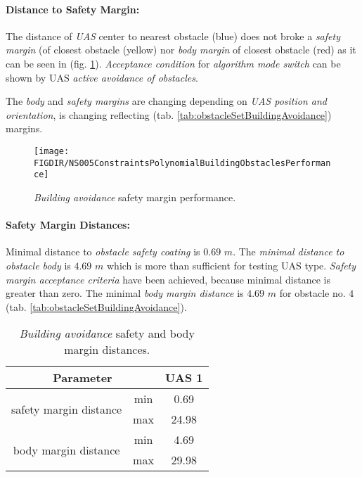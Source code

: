 \noindent\paragraph{Distance to Safety Margin:} The distance of \emph{UAS} center to nearest obstacle (blue) does not broke a \emph{safety margin} (of closest obstacle (yellow)  nor \emph{body margin} of closest obstacle (red) as it can be seen in (fig. \ref{fig:testCaseBuildingAvoidancePerformance}). \emph{Acceptance condition} for \emph{algorithm mode switch} can be shown by UAS \emph{active avoidance of obstacles}.

\begin{note}
The \emph{body} and \emph{safety margins} are changing depending on \emph{UAS position and orientation}, is changing reflecting (tab. \ref{tab:obstacleSetBuildingAvoidance}) margins. 
\end{note}


\begin{figure}[H]
	\centering
	\texttt{[image: \\FIGDIR/NS005ConstraintsPolynomialBuildingObstaclesPerformance]} 
	\caption{\emph{Building avoidance} safety margin performance.}
	\label{fig:testCaseBuildingAvoidancePerformance}
\end{figure}


\noindent\paragraph{Safety Margin Distances:} Minimal distance to \emph{obstacle safety coating} is $0.69$ $m$. The \emph{minimal distance to obstacle body} is $4.69$ $m$ which is more than sufficient for testing UAS type. \emph{Safety margin acceptance criteria} have been achieved, because minimal distance is greater than zero. The minimal \emph{body margin distance} is $4.69$ $m$ for obstacle no. $4$ (tab. \ref{tab:obstacleSetBuildingAvoidance}).

\begin{table}[H]
	\centering
	\begin{tabular}{c|c||c}
	\multicolumn{2}{c||}{Parameter} & UAS 1 \\\hline\hline
	\multirow{2}{*}{safety margin distance} & min & 0.69  \\\cline{2-3}
											& max & 24.98 \\\hline
	\multirow{2}{*}{body margin distance}   & min & 4.69  \\\cline{2-3}
											& max & 29.98 
	\end{tabular}
	\caption{\emph{Building avoidance} safety and body margin distances.}
	\label{tab:testCaseBuildingAvoidanceSafetyAndBodyMarginDistances}
\end{table}

